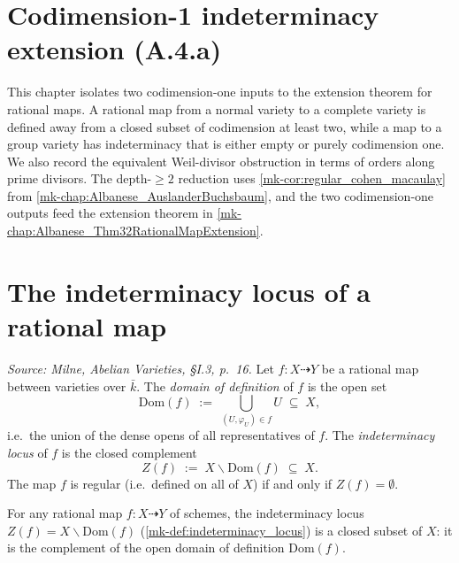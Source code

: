 
\section{Codimension-1 indeterminacy extension (A.4.a)}
\label{mk-chap:Albanese_CodimOneExtension}

This chapter isolates two codimension-one inputs to the extension theorem for rational
maps.  A rational map from a normal variety to a complete variety is defined away from a
closed subset of codimension at least two, while a map to a group variety has indeterminacy
that is either empty or purely codimension one.  We also record the equivalent
Weil-divisor obstruction in terms of orders along prime divisors.
The depth-\(\geq 2\) reduction uses
\ref{mk-cor:regular_cohen_macaulay} from
\ref{mk-chap:Albanese_AuslanderBuchsbaum}, and the two codimension-one outputs
feed the extension theorem in \ref{mk-chap:Albanese_Thm32RationalMapExtension}.

\section{The indeterminacy locus of a rational map}
\label{mk-sec:indeterm_locus}

\begin{definition}\label{mk-def:indeterminacy_locus}
  \leanok

  \textit{Source: Milne, \emph{Abelian Varieties}, \S I.3, p.~16.}
  Let \(f \colon X \dashrightarrow Y\) be a rational map between varieties over \(\bar k\).
  The \emph{domain of definition} of \(f\) is the open set
  \[
    \mathrm{Dom}(f) \;:=\; \bigcup_{(U, \varphi_U) \in f} U \;\subseteq\; X,
  \]
  i.e.\ the union of the dense opens of all representatives of \(f\). The
  \emph{indeterminacy locus} of \(f\) is the closed complement
  \[
    Z(f) \;:=\; X \smallsetminus \mathrm{Dom}(f) \;\subseteq\; X.
  \]
  The map \(f\) is regular (i.e.\ defined on all of \(X\)) if and only if \(Z(f) = \emptyset\).
\end{definition}

\begin{lemma}
  \label{mk-lem:isClosed_indeterminacy_locus}
  For any rational map \(f \colon X \dashrightarrow Y\) of schemes, the
  indeterminacy locus \(Z(f) = X \smallsetminus \mathrm{Dom}(f)\)
  (\ref{mk-def:indeterminacy_locus}) is a closed subset of \(X\): it is the
  complement of the open domain of definition \(\mathrm{Dom}(f)\).
\end{lemma}

